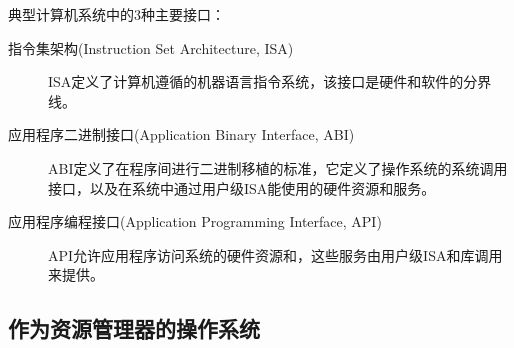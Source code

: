 {{        典型计算机系统中的3种主要接口：

        \begin{description}
            \item[指令集架构(Instruction Set Architecture, ISA)]
            {
                ISA定义了计算机遵循的机器语言指令系统，该接口是硬件和软件的分界线。
            }
            \item[应用程序二进制接口(Application Binary Interface, ABI)]
            {
                ABI定义了在程序间进行二进制移植的标准，它定义了操作系统的系统调用接口，以及在系统中通过用户级ISA能使用的硬件资源和服务。
            }
            \item[应用程序编程接口(Application Programming Interface, API)]
            {
                API允许应用程序访问系统的硬件资源和，这些服务由用户级ISA和库调用来提供。
            }
        \end{description}
    }

    \subsection{作为资源管理器的操作系统}
    {

    }
}
